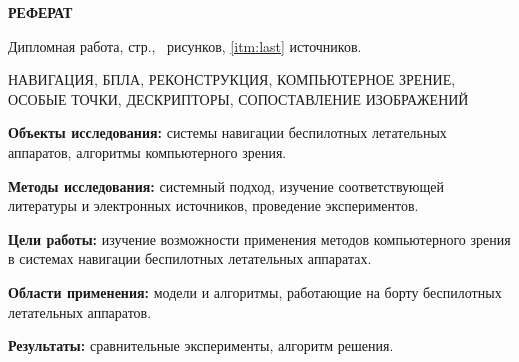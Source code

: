 \begin{center}
  \large\bfseries{РЕФЕРАТ}
\end{center}

Дипломная работа, \pageref{LastPage} стр., \totalfigures\ рисунков, \ref{itm:last} источников.

\begin{center}
  \large{НАВИГАЦИЯ, БПЛА, РЕКОНСТРУКЦИЯ, КОМПЬЮТЕРНОЕ ЗРЕНИЕ, ОСОБЫЕ ТОЧКИ, ДЕСКРИПТОРЫ, СОПОСТАВЛЕНИЕ ИЗОБРАЖЕНИЙ}
\end{center}

\textbf{Объекты исследования:} системы навигации беспилотных летательных аппаратов, алгоритмы компьютерного зрения.

\textbf{Методы исследования:} системный подход, изучение соответствующей литературы и электронных источников, проведение экспериментов.

\textbf{Цели работы:} изучение возможности применения методов компьютерного зрения в системах навигации беспилотных летательных аппаратах.

\textbf{Области применения:} модели и алгоритмы, работающие на борту беспилотных летательных аппаратов.

\textbf{Результаты:} сравнительные эксперименты, алгоритм решения.

\newpage
